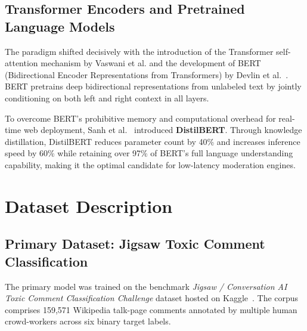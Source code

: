 \documentclass[12pt,a4paper]{article}
\begin{document}
\subsection{Transformer Encoders and Pretrained Language Models}
The paradigm shifted decisively with the introduction of the Transformer self-attention mechanism by Vaswani et al. and the development of BERT (Bidirectional Encoder Representations from Transformers) by Devlin et al.~\cite{devlin2018bert}. BERT pretrains deep bidirectional representations from unlabeled text by jointly conditioning on both left and right context in all layers. 

To overcome BERT's prohibitive memory and computational overhead for real-time web deployment, Sanh et al.~\cite{sanh2019distilbert} introduced \textbf{DistilBERT}. Through knowledge distillation, DistilBERT reduces parameter count by 40\% and increases inference speed by 60\% while retaining over 97\% of BERT's full language understanding capability, making it the optimal candidate for low-latency moderation engines.

\section{Dataset Description}

\subsection{Primary Dataset: Jigsaw Toxic Comment Classification}
The primary model was trained on the benchmark \textit{Jigsaw / Conversation AI Toxic Comment Classification Challenge} dataset hosted on Kaggle~\cite{jigsaw2018toxic}. The corpus comprises 159,571 Wikipedia talk-page comments annotated by multiple human crowd-workers across six binary target labels.
\end{document}
